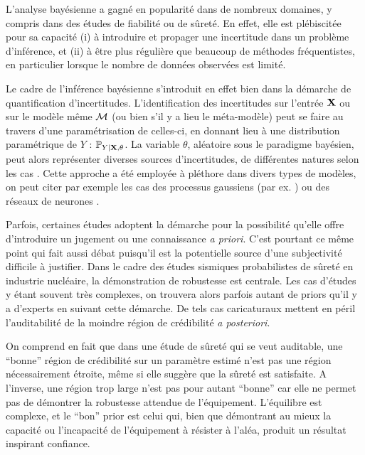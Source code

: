 L'analyse bayésienne a gagné en popularité dans de nombreux domaines, y compris dans des études de fiabilité ou de sûreté. 
En effet, elle est plébiscitée pour sa capacité (i) à introduire et propager une incertitude dans un problème d'inférence, et (ii) à être plus régulière que beaucoup de méthodes fréquentistes, en particulier lorsque le nombre de données observées est limité.

Le cadre de l'inférence bayésienne s'introduit en effet bien dans la démarche de quantification d'incertitu\-des. 
L'identification des incertitudes sur l'entrée $\mathbf{X}$ ou sur le modèle même $\mathcal{M}$ (ou bien s'il y a lieu le méta-modèle) peut se faire au travers d'une paramétrisation de celles-ci, en donnant lieu à une distribution paramétrique de $Y$ : $\mathbb{P}_{Y|\mathbf{X},\theta}$.
La variable $\theta$, aléatoire sous le paradigme bayésien, peut alors représenter diverses sources d'incertitudes, de différentes natures selon les cas \citep{bousquet_contributions_2024}. Cette approche a été employée à pléthore dans divers types de modèles, on peut citer par exemple les cas des processus gaussiens (par ex. \cite{gu_parallel_2016}) ou des réseaux de neurones \citep{arbel_bayes_2023}. 



Parfois, certaines études adoptent la démarche pour la possibilité qu'elle offre d'introduire un jugement  ou une connaissance \emph{a priori}.
C'est pourtant ce même point qui fait aussi débat puisqu'il est la potentielle source d'une subjectivité difficile à justifier.
Dans le cadre des études sismiques probabilistes de sûreté en industrie nucléaire, la démonstration de robustesse est centrale. Les cas d'études y étant souvent très complexes, on trouvera alors parfois autant de priors qu'il y a d'experts en suivant cette démarche.
De tels cas caricaturaux mettent en péril l'auditabilité de la moindre région de crédibilité \emph{a posteriori}.


On comprend en fait que dans une étude de sûreté qui se veut auditable, une ``bonne'' région de crédibilité sur un paramètre estimé n'est pas une région nécessairement étroite, même si elle suggère que la sûreté est satisfaite. A l'inverse, une région trop large n'est pas pour autant ``bonne'' car elle ne permet pas de démontrer la robustesse attendue de l'équipement. L'équilibre est complexe, et le ``bon'' prior est celui qui, bien que démontrant au mieux la capacité ou l'incapacité de l'équipement à résister à l'aléa, produit un résultat inspirant confiance. %

